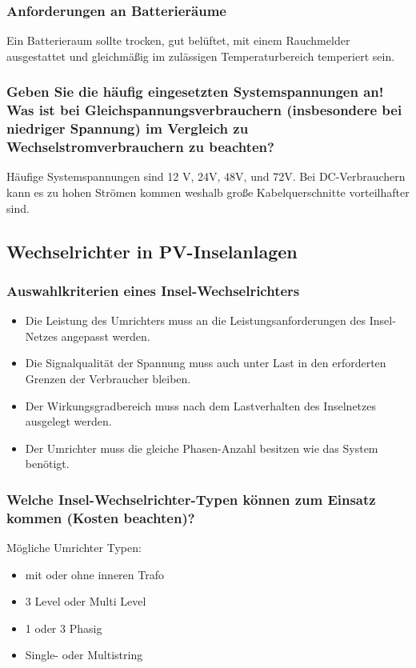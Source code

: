 \subsubsection{ Anforderungen an Batterieräume }
Ein Batterieraum sollte trocken, gut belüftet, mit einem Rauchmelder ausgestattet und gleichmäßig im zulässigen Temperaturbereich temperiert sein.
\subsubsection{Geben Sie die häufig eingesetzten Systemspannungen an! Was ist bei Gleichspannungsverbrauchern (insbesondere bei niedriger Spannung) im Vergleich zu Wechselstromverbrauchern zu beachten?}
Häufige Systemspannungen sind 12 V, 24V, 48V, und 72V.
Bei DC-Verbrauchern kann es zu hohen Strömen kommen weshalb große Kabelquerschnitte vorteilhafter sind.


\subsection{Wechselrichter in PV-Inselanlagen}
\subsubsection{Auswahlkriterien eines Insel-Wechselrichters}
\begin{itemize}
    \item Die Leistung des Umrichters muss an die Leistungsanforderungen des Insel-Netzes angepasst werden.
    \item Die Signalqualität der Spannung muss auch unter Last in den erforderten Grenzen der Verbraucher bleiben.
    \item Der Wirkungsgradbereich muss nach dem Lastverhalten des Inselnetzes ausgelegt werden.
    \item Der Umrichter muss die gleiche Phasen-Anzahl besitzen wie das System benötigt.
\end{itemize}
\subsubsection{Welche Insel-Wechselrichter-Typen können zum Einsatz kommen (Kosten beachten)?}
Mögliche Umrichter Typen:
\begin{itemize}
    \item mit oder ohne inneren Trafo
    \item 3 Level oder Multi Level
    \item 1 oder 3 Phasig
    \item Single- oder Multistring
\end{itemize} 
